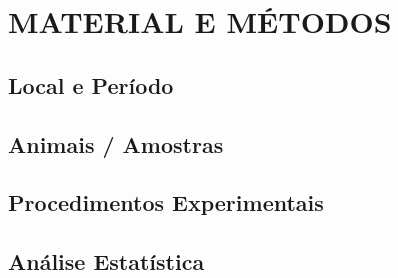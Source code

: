\chapter{MATERIAL E MÉTODOS}
\label{cap:metodos}


\section{Local e Período}


\section{Animais / Amostras}


\section{Procedimentos Experimentais}


\section{Análise Estatística}

